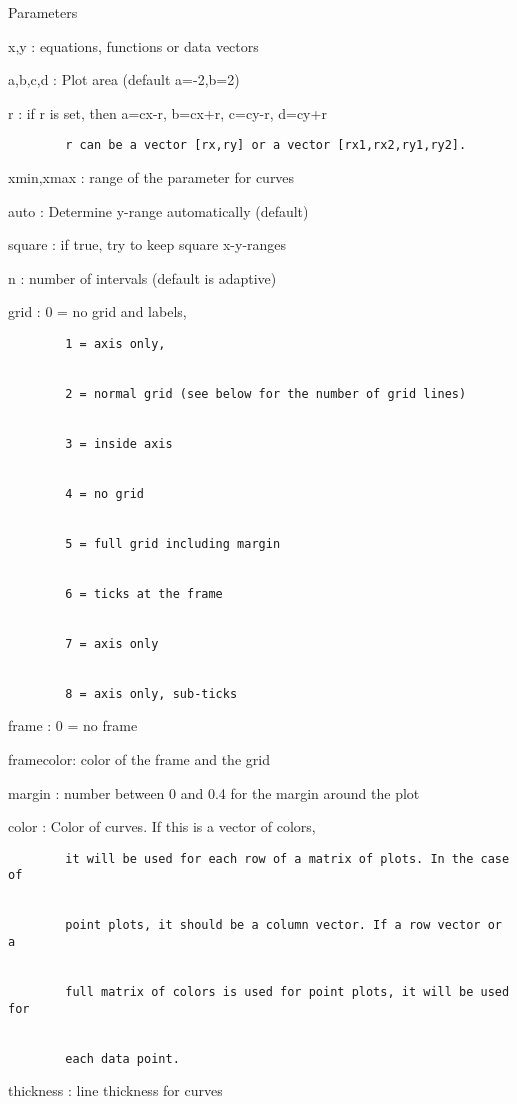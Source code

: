 \documentclass[
]{book}
\begin{document}
Parameters

x,y : equations, functions or data vectors

a,b,c,d : Plot area (default a=-2,b=2)

r : if r is set, then a=cx-r, b=cx+r, c=cy-r, d=cy+r

\begin{verbatim}
        r can be a vector [rx,ry] or a vector [rx1,rx2,ry1,ry2].
\end{verbatim}

xmin,xmax : range of the parameter for curves

auto : Determine y-range automatically (default)

square : if true, try to keep square x-y-ranges

n : number of intervals (default is adaptive)

grid : 0 = no grid and labels,

\begin{verbatim}
        1 = axis only,


        2 = normal grid (see below for the number of grid lines)


        3 = inside axis


        4 = no grid


        5 = full grid including margin


        6 = ticks at the frame


        7 = axis only


        8 = axis only, sub-ticks
\end{verbatim}

frame : 0 = no frame

framecolor: color of the frame and the grid

margin : number between 0 and 0.4 for the margin around the plot

color : Color of curves. If this is a vector of colors,

\begin{verbatim}
        it will be used for each row of a matrix of plots. In the case of


        point plots, it should be a column vector. If a row vector or a


        full matrix of colors is used for point plots, it will be used for


        each data point.
\end{verbatim}

thickness : line thickness for curves
\end{document}
